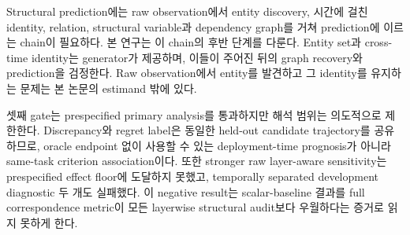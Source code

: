 Structural prediction에는 raw observation에서 entity discovery, 시간에 걸친
identity, relation, structural variable과 dependency graph를 거쳐 prediction에
이르는 chain이 필요하다. 본 연구는 이 chain의 후반 단계를 다룬다. Entity set과
cross-time identity는 generator가 제공하며, 이들이 주어진 뒤의 graph recovery와
prediction을 검정한다. Raw observation에서 entity를 발견하고 그 identity를
유지하는 문제는 본 논문의 estimand 밖에 있다.

셋째 gate는 prespecified primary analysis를 통과하지만 해석 범위는
의도적으로 제한한다. Discrepancy와 regret label은 동일한 held-out candidate
trajectory를 공유하므로, oracle endpoint 없이 사용할 수 있는
deployment-time prognosis가 아니라 same-task criterion association이다. 또한 stronger raw
layer-aware sensitivity는 prespecified effect floor에 도달하지 못했고,
temporally separated development diagnostic 두 개도 실패했다. 이 negative
result는 scalar-baseline 결과를 full correspondence metric이 모든 layerwise
structural audit보다 우월하다는 증거로 읽지 못하게 한다.
